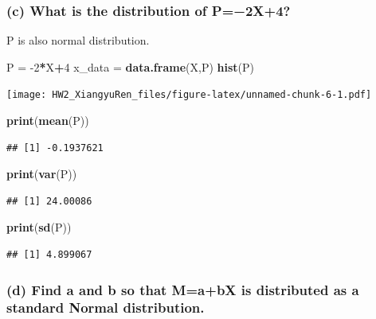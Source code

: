 \documentclass[
]{article}
\newenvironment{Shaded}{\begin{snugshade}}{\end{snugshade}}
\newcommand{\DecValTok}[1]{\textcolor[rgb]{0.00,0.00,0.81}{#1}}
\newcommand{\KeywordTok}[1]{\textcolor[rgb]{0.13,0.29,0.53}{\textbf{#1}}}
\newcommand{\NormalTok}[1]{#1}
\newcommand{\OperatorTok}[1]{\textcolor[rgb]{0.81,0.36,0.00}{\textbf{#1}}}
\newcommand{\StringTok}[1]{\textcolor[rgb]{0.31,0.60,0.02}{#1}}
\begin{document}
\hypertarget{c-what-is-the-distribution-of-p2x4}{%
\subsubsection{(c) What is the distribution of
P=−2X+4?}\label{c-what-is-the-distribution-of-p2x4}}

P is also normal distribution.

\begin{Shaded}
\begin{Highlighting}[]
\NormalTok{P =}\StringTok{ }\DecValTok{-2}\OperatorTok{*}\NormalTok{X}\OperatorTok{+}\DecValTok{4}
\NormalTok{x_data =}\StringTok{ }\KeywordTok{data.frame}\NormalTok{(X,P)}
\KeywordTok{hist}\NormalTok{(P)}
\end{Highlighting}
\end{Shaded}

\texttt{[image: HW2\_XiangyuRen\_files/figure-latex/unnamed-chunk-6-1.pdf]}

\begin{Shaded}
\begin{Highlighting}[]
\KeywordTok{print}\NormalTok{(}\KeywordTok{mean}\NormalTok{(P))}
\end{Highlighting}
\end{Shaded}

\begin{verbatim}
## [1] -0.1937621
\end{verbatim}

\begin{Shaded}
\begin{Highlighting}[]
\KeywordTok{print}\NormalTok{(}\KeywordTok{var}\NormalTok{(P))}
\end{Highlighting}
\end{Shaded}

\begin{verbatim}
## [1] 24.00086
\end{verbatim}

\begin{Shaded}
\begin{Highlighting}[]
\KeywordTok{print}\NormalTok{(}\KeywordTok{sd}\NormalTok{(P))}
\end{Highlighting}
\end{Shaded}

\begin{verbatim}
## [1] 4.899067
\end{verbatim}

\hypertarget{d-find-a-and-b-so-that-mabx-is-distributed-as-a-standard-normal-distribution.}{%
\subsubsection{(d) Find a and b so that M=a+bX is distributed as a
standard Normal
distribution.}\label{d-find-a-and-b-so-that-mabx-is-distributed-as-a-standard-normal-distribution.}}
\end{document}
